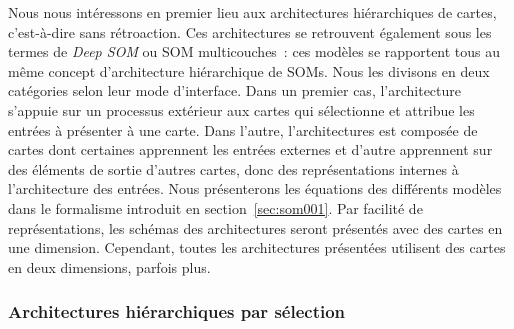 \documentclass[../main]{subfiles}
\begin{document}
Nous nous intéressons en premier lieu aux architectures hiérarchiques de cartes, c'est-à-dire sans rétroaction. Ces architectures se retrouvent également sous les termes de \emph{Deep SOM} ou SOM multicouches~: ces modèles se rapportent tous au même concept d'architecture hiérarchique de SOMs.
Nous les divisons en deux catégories selon leur mode d'interface. Dans un premier cas, l'architecture s'appuie sur un processus extérieur aux cartes qui sélectionne et attribue les entrées à présenter à une carte. Dans l'autre, l'architectures est composée de cartes dont certaines apprennent les entrées externes et d'autre apprennent sur des éléments de sortie d'autres cartes, donc des représentations internes à l'architecture des entrées.
Nous présenterons les équations des différents modèles dans le formalisme introduit en section~\ref{sec:som001}. 
Par facilité de représentations, les schémas des architectures seront présentés avec des cartes en une dimension. Cependant, toutes les architectures présentées utilisent des cartes en deux dimensions, parfois plus.
\subsubsection{Architectures hiérarchiques par sélection}
\end{document}
